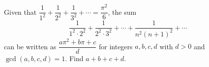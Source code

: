 Given that $\dfrac{1}{1^2}+\dfrac{1}{2^2}+\dfrac{1}{3^2}+\cdots=\dfrac{\pi^2}{6}$, the sum
\[
\dfrac{1}{1^2\cdot2^2}+\dfrac{1}{2^2\cdot3^2}+\cdots+\dfrac{1}{n^2(n+1)^2}+\cdots
\]
can be written as $\dfrac{a\pi^2+b\pi+c}{d}$ for integers $a,b,c,d$ with $d>0$ and $\gcd(a,b,c,d)=1$. Find $a+b+c+d$.
